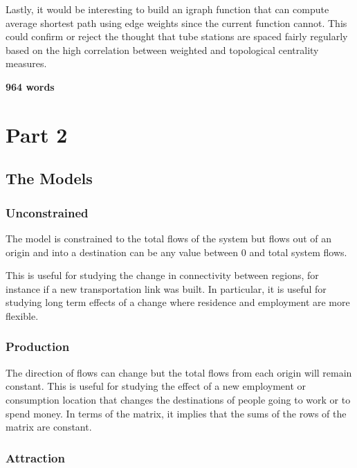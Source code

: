 \documentclass[11pt]{article} %
\begin{document}
Lastly, it would be interesting to build an igraph function that can compute average shortest path using edge weights since the current function cannot. This could confirm or reject the thought that tube stations are spaced fairly regularly based on the high correlation between weighted and topological centrality measures. 

\textbf{964 words}


\pagebreak

\section{Part 2}

\subsection{The Models}

\subsubsection{Unconstrained}

The model is constrained to the total flows of the system but flows out of an origin and into a destination can be any value between 0 and total system flows. 

This is useful for studying the change in connectivity between regions, for instance if a new transportation link was built. In particular, it is useful for studying long term effects of a change where residence and employment are more flexible. 

\subsubsection{Production}

The direction of flows can change but the total flows from each origin will remain constant. This is useful for studying the effect of a new employment or consumption location that changes the destinations of people going to work or to spend money. In terms of the matrix, it implies that the sums of the rows of the matrix are constant. 

\subsubsection{Attraction}
\end{document}
